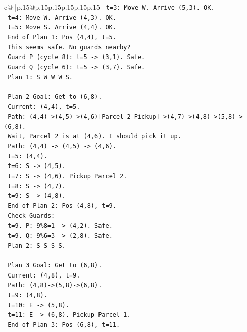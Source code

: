 \documentclass{article}
\begin{document}
{\begin{supertabular}{c@{$\;$}|p{.15\linewidth}@{}p{.15\linewidth}p{.15\linewidth}p{.15\linewidth}p{.15\linewidth}p{.15\linewidth}}
{{{\texttt{    t=3: Move W. Arrive (5,3). OK.} \\
\texttt{    t=4: Move W. Arrive (4,3). OK.} \\
\texttt{    t=5: Move S. Arrive (4,4). OK.} \\
\texttt{    End of Plan 1: Pos (4,4), t=5.} \\
\texttt{    This seems safe. No guards nearby?} \\
\texttt{    Guard P (cycle 8): t=5 {-}> (3,1). Safe.} \\
\texttt{    Guard Q (cycle 6): t=5 {-}> (3,7). Safe.} \\
\texttt{    Plan 1: S W W W S.} \\
\\ 
\texttt{    Plan 2 Goal: Get to (6,8).} \\
\texttt{    Current: (4,4), t=5.} \\
\texttt{    Path: (4,4){-}>(4,5){-}>(4,6){[}Parcel 2 Pickup{]}{-}>(4,7){-}>(4,8){-}>(5,8){-}>(6,8).} \\
\texttt{    Wait, Parcel 2 is at (4,6). I should pick it up.} \\
\texttt{    Path: (4,4) {-}> (4,5) {-}> (4,6).} \\
\texttt{    t=5: (4,4).} \\
\texttt{    t=6: S {-}> (4,5).} \\
\texttt{    t=7: S {-}> (4,6). Pickup Parcel 2.} \\
\texttt{    t=8: S {-}> (4,7).} \\
\texttt{    t=9: S {-}> (4,8).} \\
\texttt{    End of Plan 2: Pos (4,8), t=9.} \\
\texttt{    Check Guards:} \\
\texttt{    t=9. P: 9\%8=1 {-}> (4,2). Safe.} \\
\texttt{    t=9. Q: 9\%6=3 {-}> (2,8). Safe.} \\
\texttt{    Plan 2: S S S S.} \\
\\ 
\texttt{    Plan 3 Goal: Get to (6,8).} \\
\texttt{    Current: (4,8), t=9.} \\
\texttt{    Path: (4,8){-}>(5,8){-}>(6,8).} \\
\texttt{    t=9: (4,8).} \\
\texttt{    t=10: E {-}> (5,8).} \\
\texttt{    t=11: E {-}> (6,8). Pickup Parcel 1.} \\
\texttt{    End of Plan 3: Pos (6,8), t=11.} \\
}}}
\end{supertabular}}
\end{document}
